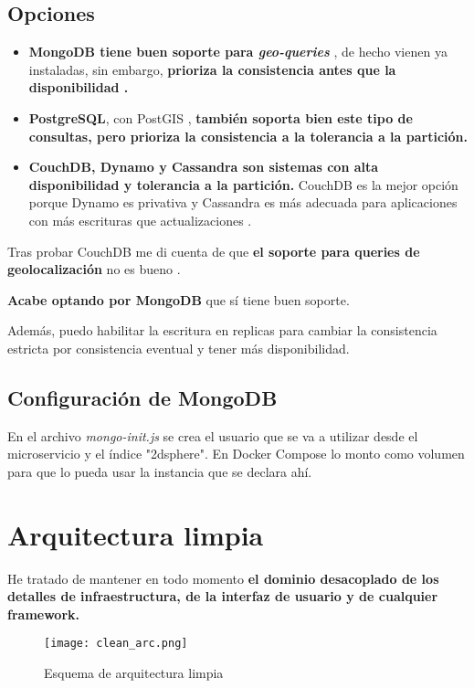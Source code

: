 \subsection{Opciones}

\begin{itemize}
	\item \textbf{MongoDB tiene buen soporte para \textit{geo-queries}} \cite{mongo}, de hecho vienen ya instaladas, sin embargo, \textbf{prioriza la consistencia antes que la disponibilidad \cite{mongo-cap}.} 
\item \textbf{PostgreSQL}, con PostGIS \cite{postgis}, \textbf{también soporta bien este tipo de consultas, pero prioriza la consistencia a la tolerancia a la partición.} 
\item \textbf{CouchDB, Dynamo y Cassandra son sistemas con alta disponibilidad y tolerancia a la partición.} CouchDB es la mejor opción porque Dynamo es privativa y Cassandra es más adecuada para aplicaciones con más
escrituras que actualizaciones \cite{cassandra}. 
\end{itemize}



Tras probar CouchDB me di cuenta de que \textbf{el soporte para queries de geolocalización} no es bueno \cite{couchdb}.

\textbf{Acabe optando por MongoDB} que sí tiene buen soporte.

Además, puedo habilitar la escritura en replicas para cambiar la consistencia estricta por consistencia eventual y tener más disponibilidad. 

\subsection{Configuración de MongoDB}

En el archivo \textit{mongo-init.js} se crea el usuario que se va a utilizar desde el microservicio y el índice "2dsphere". 
En Docker Compose lo monto como volumen para que lo pueda usar la instancia que se declara ahí.

\section{Arquitectura limpia}\label{sec:clean}

He tratado de mantener en todo momento \textbf{el dominio desacoplado de los detalles de infraestructura, de la interfaz de usuario y de cualquier framework.}
\begin{figure}[H]
	\centering	
	\texttt{[image: clean\_arc.png]}
	\caption{Esquema de arquitectura limpia \cite{clean-arch}}
	\end{figure}

